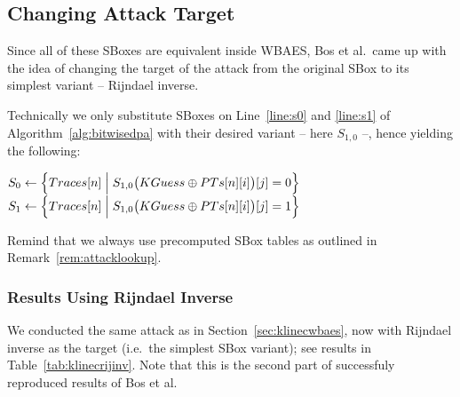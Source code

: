 
\subsection{Changing Attack Target}
\label{sec:rijinv}

Since all of these SBoxes are equivalent inside WBAES, Bos et al.\ came up with the idea of changing the target of the attack from the original SBox to its simplest variant -- Rijndael inverse.

\begin{remark}
\label{rem:spq}
	Technically we only substitute SBoxes on Line~\ref{line:s0} and \ref{line:s1} of Algorithm~\ref{alg:bitwisedpa} with their desired variant -- here $S_{1,0}$ --, hence yielding the following:
	\begin{algorithmic}[1]
		\setcounter{ALG@line}{5}
		\State $S_0 \gets \Bigl\{ Traces[n] \Bigm| S_{1,0}\bigl(KGuess\oplus PTs[n][i]\bigr)[j] = 0 \Bigr\}$
		\State $S_1 \gets \Bigl\{ Traces[n] \Bigm| S_{1,0}\bigl(KGuess\oplus PTs[n][i]\bigr)[j] = 1 \Bigr\}$
	\end{algorithmic}
	Remind that we always use precomputed SBox tables as outlined in Remark~\ref{rem:attacklookup}.
\end{remark}

\subsubsection{Results Using Rijndael Inverse}
	
	We conducted the same attack as in Section~\ref{sec:klinecwbaes}, now with Rijndael inverse as the target (i.e.\ the simplest SBox variant); see results in Table~\ref{tab:klinecrijinv}. Note that this is the second part of successfuly reproduced results of Bos et al.
	
	
